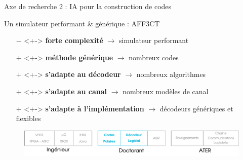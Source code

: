 \documentclass[t,compress,mathserif,12pt,xcolor=dvipsnames]{beamer}
\newcommand{\RED} [1]{\textcolor{Paired-5}{\textbf{#1}}}
\newcommand{\GREEN} [1]{\textcolor{Paired-3}{\textbf{#1}}}
\begin{document}
\begin{frame}[t]{Axe de recherche 2 : IA pour la construction de codes}
  \begin{minipage}[t][5.0cm][t]{\textwidth}
    \begin{center}
      Un simulateur performant \& générique : AFF3CT
    \end{center}
    \begin{itemize}
      \item[\RED{$-$}]  <+-> \RED  {forte complexité} $\rightarrow$ simulateur performant
      \item[\GREEN{$+$}]<+-> \GREEN{méthode générique} $\rightarrow$ nombreux codes
      \item[\GREEN{$+$}]<+-> \GREEN{s'adapte au décodeur} $\rightarrow$ nombreux algorithmes
      \item[\GREEN{$+$}]<+-> \GREEN{s'adapte au canal} $\rightarrow$ nombreux modèles de canal
      \item[\GREEN{$+$}]<+-> \GREEN{s'adapte à l'implémentation} $\rightarrow$ décodeurs génériques et flexibles
    \end{itemize}
\end{minipage}
\begin{figure}[htp]
  \centering
  \includegraphics[width=\textwidth]{fig/frise24}
\end{figure}
\end{frame}
\end{document}

